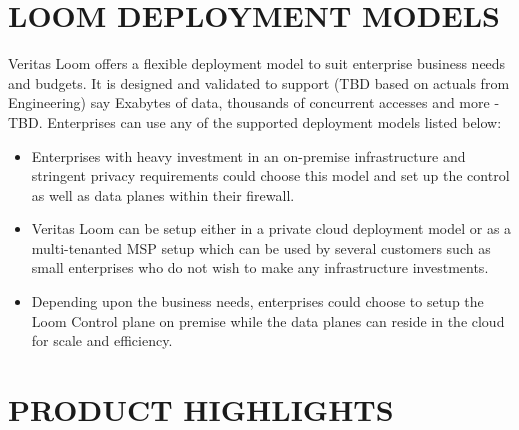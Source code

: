 \documentclass[letterpaper,10pt,english]{sphinxhowto}
\begin{document}
\section{LOOM DEPLOYMENT MODELS}
\label{\detokenize{col/ds/mcdmp_ds_opt1:loom-deployment-models}}
Veritas Loom  offers a flexible deployment model to suit enterprise business needs and budgets. It is designed and validated to support (TBD based on actuals from Engineering) say Exabytes of data, thousands of concurrent accesses and more - TBD. Enterprises can use any of the supported deployment models listed below:
\begin{itemize}
\item {} 
 Enterprises with heavy investment in an on-premise infrastructure and stringent privacy requirements could choose this model and set up the control as well as data planes within their firewall.

\item {} 
 Veritas Loom can be setup either in a private cloud deployment model or as a multi-tenanted MSP setup which can be used by several customers such as small enterprises who do not wish to make any infrastructure investments.

\item {} 
 Depending upon the business needs, enterprises could choose to setup the Loom Control plane on premise while the data planes can reside in the cloud for scale and efficiency.

\end{itemize}


\section{PRODUCT HIGHLIGHTS}
\label{\detokenize{col/ds/mcdmp_ds_opt1:product-highlights}}
\end{document}
